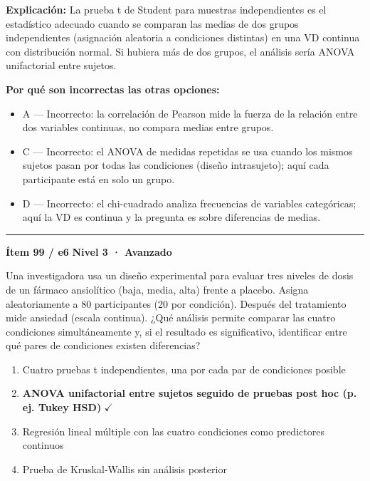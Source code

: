 \documentclass[12pt,a4paper]{article}
\begin{document}
\noindent\textbf{\color{azul}Explicación:} La prueba t de Student para muestras independientes es el estadístico adecuado cuando se comparan las medias de dos grupos independientes (asignación aleatoria a condiciones distintas) en una VD continua con distribución normal. Si hubiera más de dos grupos, el análisis sería ANOVA unifactorial entre sujetos.

\noindent\textbf{\color{gris}Por qué son incorrectas las otras opciones:}
\begin{itemize}
  \item {\small A — Incorrecto: la correlación de Pearson mide la fuerza de la relación entre dos variables continuas, no compara medias entre grupos.}
  \item {\small C — Incorrecto: el ANOVA de medidas repetidas se usa cuando los mismos sujetos pasan por todas las condiciones (diseño intrasujeto); aquí cada participante está en solo un grupo.}
  \item {\small D — Incorrecto: el chi-cuadrado analiza frecuencias de variables categóricas; aquí la VD es continua y la pregunta es sobre diferencias de medias.}
\end{itemize}
\vspace{8pt}\hrule\vspace{10pt}

\begin{mdframed}[backgroundcolor=fondogris,linecolor=rojo,linewidth=1pt,innerleftmargin=10pt,innerrightmargin=10pt,innertopmargin=7pt,innerbottommargin=7pt]
\textbf{Ítem 99 / e6} \hfill {\small\bfseries\color{rojo} Nivel 3 · Avanzado}
\end{mdframed}

Una investigadora usa un diseño experimental para evaluar tres niveles de dosis de un fármaco ansiolítico (baja, media, alta) frente a placebo. Asigna aleatoriamente a 80 participantes (20 por condición). Después del tratamiento mide ansiedad (escala continua). ¿Qué análisis permite comparar las cuatro condiciones simultáneamente y, si el resultado es significativo, identificar entre qué pares de condiciones existen diferencias?

\begin{enumerate}
  \item[A.] Cuatro pruebas t independientes, una por cada par de condiciones posible
  \item[\textbf{\color{verde}B.}] \textbf{\color{verde} ANOVA unifactorial entre sujetos seguido de pruebas post hoc (p. ej. Tukey HSD)} \hfill $\checkmark$
  \item[C.] Regresión lineal múltiple con las cuatro condiciones como predictores continuos
  \item[D.] Prueba de Kruskal-Wallis sin análisis posterior
\end{enumerate}
\end{document}
